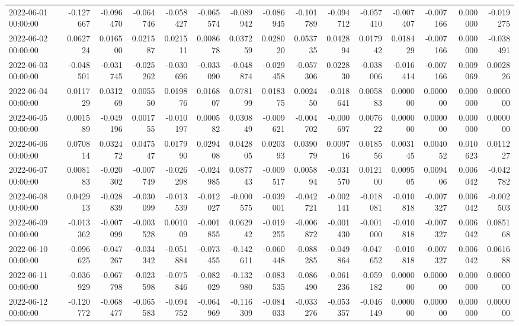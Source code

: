 \begin{tabular}{lrrrrrrrrrrrrrr}
2022-06-01 00:00:00 & -0.127667 & -0.096470 & -0.064746 & -0.058427 & -0.065574 & -0.089942 & -0.086945 & -0.101789 & -0.094712 & -0.057410 & -0.007407 & -0.007166 & 0.000000 & -0.019275 \\
2022-06-02 00:00:00 & 0.062724 & 0.016500 & 0.021587 & 0.021511 & 0.008678 & 0.037259 & 0.028020 & 0.053735 & 0.042894 & 0.017942 & 0.018429 & -0.007166 & 0.000000 & -0.038491 \\
2022-06-03 00:00:00 & -0.048501 & -0.031745 & -0.025262 & -0.030696 & -0.033090 & -0.048874 & -0.029458 & -0.057306 & 0.022830 & -0.038006 & -0.016414 & -0.007166 & 0.009069 & 0.002826 \\
2022-06-04 00:00:00 & 0.011729 & 0.031269 & 0.005550 & 0.019876 & 0.016807 & 0.078199 & 0.018375 & 0.002450 & -0.018641 & 0.005883 & 0.000000 & 0.000000 & 0.000000 & 0.000000 \\
2022-06-05 00:00:00 & 0.001589 & -0.049196 & 0.001755 & -0.010197 & 0.000582 & 0.030849 & -0.009621 & -0.004702 & -0.000697 & 0.007622 & 0.000000 & 0.000000 & 0.000000 & 0.000000 \\
2022-06-06 00:00:00 & 0.070814 & 0.032472 & 0.047547 & 0.017990 & 0.029408 & 0.042805 & 0.020393 & 0.039079 & 0.009716 & 0.018556 & 0.003145 & 0.004052 & 0.010623 & 0.011227 \\
2022-06-07 00:00:00 & 0.008183 & -0.020302 & -0.007749 & -0.026298 & -0.024985 & 0.087743 & -0.009517 & 0.005894 & -0.031570 & 0.012100 & 0.009505 & 0.009406 & 0.006042 & -0.042782 \\
2022-06-08 00:00:00 & 0.042913 & -0.028839 & -0.030099 & -0.013539 & -0.012027 & -0.000575 & -0.039001 & -0.042721 & -0.002141 & -0.018081 & -0.010818 & -0.007327 & 0.006042 & -0.002503 \\
2022-06-09 00:00:00 & -0.013362 & -0.007099 & -0.003528 & 0.001009 & -0.001855 & 0.062942 & -0.019255 & -0.006872 & -0.001430 & -0.001000 & -0.010818 & -0.007327 & 0.006042 & 0.085168 \\
2022-06-10 00:00:00 & -0.096625 & -0.047267 & -0.034342 & -0.051884 & -0.073455 & -0.142611 & -0.060448 & -0.088285 & -0.049864 & -0.047652 & -0.010818 & -0.007327 & 0.006042 & 0.061688 \\
2022-06-11 00:00:00 & -0.036929 & -0.067798 & -0.023598 & -0.075846 & -0.082029 & -0.132980 & -0.083535 & -0.086490 & -0.061236 & -0.059182 & 0.000000 & 0.000000 & 0.000000 & 0.000000 \\
2022-06-12 00:00:00 & -0.120772 & -0.068477 & -0.065583 & -0.094752 & -0.064969 & -0.116309 & -0.084033 & -0.033276 & -0.053357 & -0.046149 & 0.000000 & 0.000000 & 0.000000 & 0.000000 \\

\end{tabular}

